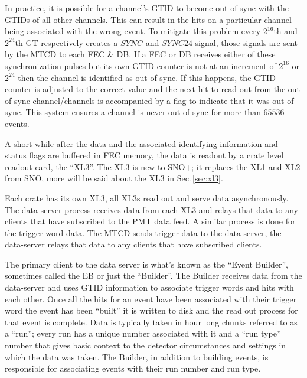 In practice, it is possible for a channel's GTID to become out of sync with the GTIDs of
all other channels.
This can result in the hits on a particular channel being associated with
the wrong event.
To mitigate this problem every $2^{16}$th and $2^{24}$th GT respectively creates a $SYNC$ and
$SYNC24$ signal, those signals are sent by the MTCD to each FEC \& DB\@.
If a FEC or DB receives either of these synchronization pulses but its own GTID counter is not
at an increment of $2^{16}$ or $2^{24}$ then the channel is identified as out of sync.
If this happens, the GTID counter is adjusted to the correct value and the next hit to read out from the out of sync channel/channels is accompanied
by a flag to indicate that it was out of sync.
This system ensures a channel is never out of sync for more than $65536$ events.

A short while after the data and the associated identifying information and status flags are buffered
in FEC memory, the data is readout by a crate level readout card,
the ``XL3''.
The XL3 is new to SNO+; it replaces the XL1 and XL2 from SNO, more will be said about the
XL3 in Sec.\,\ref{sec:xl3}.

Each crate has its own XL3, all XL3s read out and serve data asynchronously.
The data-server process receives data from each XL3 and relays that data to
any clients that have subscribed to the PMT data feed.
A similar process is done for the trigger word data. The MTCD sends trigger data
to the data-server, the data-server relays that data to any clients that have subscribed
clients.

The primary client to the data server is what's known as the ``Event Builder'', sometimes
called the EB or just the ``Builder''. The Builder receives data from the data-server and
uses GTID information to associate trigger words and hits with each other.
Once all the hits for an event have been associated with their trigger word the event
has been ``built'' it is written to disk and the read out process for that event is complete.
Data is typically taken in hour long chunks referred to as a ``run'';
every run has a unique number associated with it and a ``run type'' number that
gives basic context to the detector circumstances and settings in which the data was taken.
The Builder, in addition to building events, is responsible for associating
events with their run number and run type.

